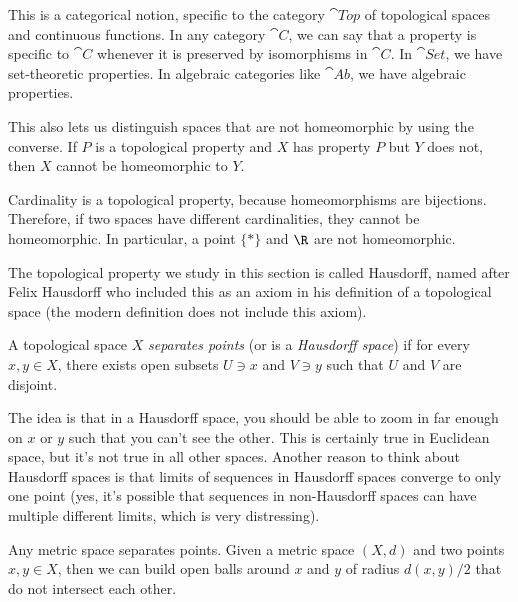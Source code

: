 \documentclass[noname]{notes}
\begin{document}
\begin{remark}
	This is a categorical notion, specific to the category $\cat{Top}$ of topological spaces and continuous functions. In any category $\cat{C}$, we can say that a property is specific to $\cat{C}$ whenever it is preserved by isomorphisms in $\cat{C}$. In $\cat{Set}$, we have set-theoretic properties. In algebraic categories like $\cat{Ab}$, we have algebraic properties. 
\end{remark}

This also lets us distinguish spaces that are not homeomorphic by using the converse. If $P$ is a topological property and $X$ has property $P$ but $Y$ does not, then $X$ cannot be homeomorphic to $Y$. 

\begin{example}
	Cardinality is a topological property, because homeomorphisms are bijections. Therefore, if two spaces have different cardinalities, they cannot be homeomorphic. In particular, a point $\{*\}$ and $\R$ are not homeomorphic. 
\end{example}

The topological property we study in this section is called Hausdorff, named after Felix Hausdorff who included this as an axiom in his definition of a topological space (the modern definition does not include this axiom). 

\begin{definition}
	A topological space $X$ \emph{separates points} (or is a \emph{Hausdorff space}) if for every $x, y \in X$, there exists open subsets $U \ni x$ and $V \ni y$ such that $U$ and $V$ are disjoint. 
\end{definition}

The idea is that in a Hausdorff space, you should be able to zoom in far enough on $x$ or $y$ such that you can't see the other. This is certainly true in Euclidean space, but it's not true in all other spaces. Another reason to think about Hausdorff spaces is that limits of sequences in Hausdorff spaces converge to only one point (yes, it's possible that sequences in non-Hausdorff spaces can have multiple different limits, which is very distressing).

\begin{example}
	Any metric space separates points. Given a metric space $(X,d)$ and two points $x, y \in X$, then we can build open balls around $x$ and $y$ of radius $d(x,y)/2$ that do not intersect each other. 
\end{example}
\end{document}
